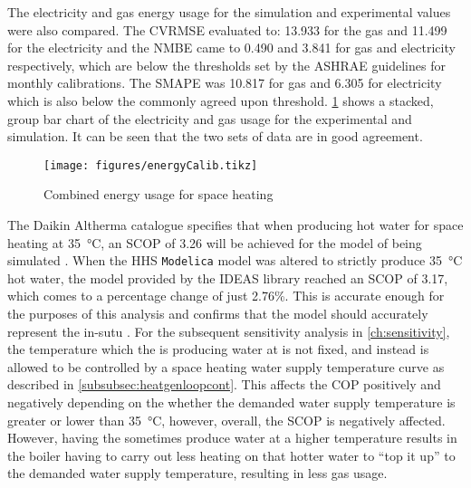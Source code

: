 The electricity and gas energy usage for the simulation and experimental values were also compared. The \ac{CVRMSE} evaluated to: \num{13.933} for the gas and \num{11.499} for the electricity and the \ac{NMBE} came to \num{0.490} and \num{3.841} for gas and electricity respectively, which are below the thresholds set by the ASHRAE guidelines for monthly calibrations. The \ac{SMAPE} was \num{10.817} for gas and \num{6.305} for electricity which is also below the commonly agreed upon threshold. \cref{fig:energycalib} shows a stacked, group bar chart of the electricity and gas usage for the experimental and simulation. It can be seen that the two sets of data are in good agreement.


\begin{figure}[htb]
    \centering
    \texttt{[image: figures/energyCalib.tikz]}
    \caption{Combined energy usage for space heating}
    \label{fig:energycalib}
\end{figure}


The Daikin Altherma \HP catalogue specifies that when producing hot water for space heating at \qty{35}{\celsius}, an \ac{SCOP} of 3.26 will be achieved for the model of \HP being simulated \cite{daikin_daikin_2018}. When the \ac{HHS} \texttt{Modelica} model was altered to strictly produce \qty{35}{\celsius} hot water, the \HP model provided by the IDEAS library reached an \ac{SCOP} of 3.17, which comes to a percentage change of just 2.76\%. This is accurate enough for the purposes of this analysis and confirms that the model should accurately represent the in-sutu \HP. For the subsequent sensitivity analysis in \cref{ch:sensitivity}, the temperature which the \HP is producing water at is not fixed, and instead is allowed to be controlled by a space heating water supply temperature curve as described in \cref{subsubsec:heatgenloopcont}. This affects the \ac{COP} positively and negatively depending on the whether the demanded water supply temperature is greater or lower than \qty{35}{\celsius}, however, overall, the \ac{SCOP} is negatively affected. However, having the \HP sometimes produce water at a higher temperature results in the boiler having to carry out less heating on that hotter water to ``top it up'' to the demanded water supply temperature, resulting in less gas usage.



